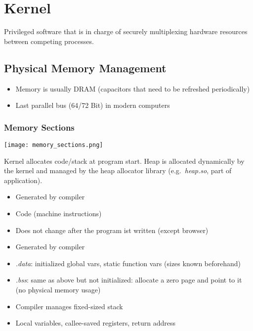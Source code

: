 \section{Kernel}
Privileged software that is in charge of securely multiplexing hardware resources between competing processes.

\subsection{Physical Memory Management}
\begin{itemize}
    \item Memory is usually DRAM (capacitors that need to be refreshed periodically)
    \item Last parallel bus (64/72 Bit) in modern computers
\end{itemize}


\subsubsection{Memory Sections}
\texttt{[image: memory\_sections.png]}

Kernel allocates code/stack at program start. Heap is allocated dynamically by the kernel and managed by the heap allocator library (e.g.\ \textit{heap.so}, part of application).


\begin{itemize}
    \item Generated by compiler
    \item Code (machine instructions)
    \item Does not change after the program ist written (except browser)
\end{itemize}



\begin{itemize}
    \item Generated by compiler
    \item \textit{.data}: initialized global vars, static function vars (sizes known beforehand)
    \item \textit{.bss}: same as above but not initialized: allocate a zero page and point to it (no physical memory usage)
\end{itemize}


\begin{itemize}
    \item Compiler manages fixed-sized stack
    \item Local variables, callee-saved registers, return address
\end{itemize}

